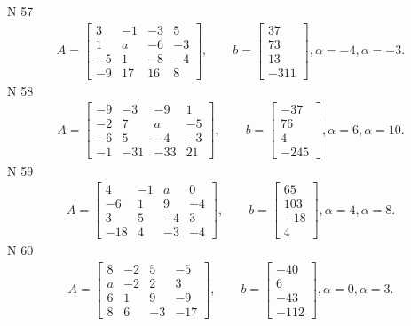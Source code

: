 \documentclass[11pt]{report}
\begin{document}
N 57
\begin{align*}
 A = \left[\begin{matrix}3 & -1 & -3 & 5\\1 & a & -6 & -3\\-5 & 1 & -8 & -4\\-9 & 17 & 16 & 8\end{matrix}\right],
    \qquad b = \left[\begin{matrix}37\\73\\13\\-311\end{matrix}\right], \alpha = -4, \alpha = -3. 
 \end{align*}
N 58
\begin{align*}
 A = \left[\begin{matrix}-9 & -3 & -9 & 1\\-2 & 7 & a & -5\\-6 & 5 & -4 & -3\\-1 & -31 & -33 & 21\end{matrix}\right],
    \qquad b = \left[\begin{matrix}-37\\76\\4\\-245\end{matrix}\right], \alpha = 6, \alpha = 10. 
 \end{align*}
N 59
\begin{align*}
 A = \left[\begin{matrix}4 & -1 & a & 0\\-6 & 1 & 9 & -4\\3 & 5 & -4 & 3\\-18 & 4 & -3 & -4\end{matrix}\right],
    \qquad b = \left[\begin{matrix}65\\103\\-18\\4\end{matrix}\right], \alpha = 4, \alpha = 8. 
 \end{align*}
N 60
\begin{align*}
 A = \left[\begin{matrix}8 & -2 & 5 & -5\\a & -2 & 2 & 3\\6 & 1 & 9 & -9\\8 & 6 & -3 & -17\end{matrix}\right],
    \qquad b = \left[\begin{matrix}-40\\6\\-43\\-112\end{matrix}\right], \alpha = 0, \alpha = 3. 
 \end{align*}
\end{document}
